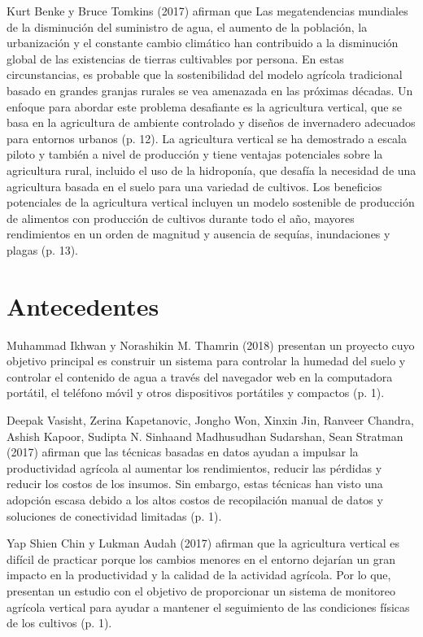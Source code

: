 \documentclass{report}
\begin{document}
  Kurt Benke y Bruce Tomkins (2017) afirman que Las megatendencias mundiales de
  la disminución del suministro de agua, el aumento de la población, la
  urbanización y el constante cambio climático han contribuido a la disminución
  global de las existencias de tierras cultivables por persona. En estas
  circunstancias, es probable que la sostenibilidad del modelo agrícola
  tradicional basado en grandes granjas rurales se vea amenazada en las próximas
  décadas. Un enfoque para abordar este problema desafiante es la agricultura
  vertical, que se basa en la agricultura de ambiente controlado y diseños de
  invernadero adecuados para entornos urbanos (p. 12). La agricultura vertical
  se ha demostrado a escala piloto y también a nivel de producción y tiene
  ventajas potenciales sobre la agricultura rural, incluido el uso de la
  hidroponía, que desafía la necesidad de una agricultura basada en el suelo
  para una variedad de cultivos. Los beneficios potenciales de la agricultura
  vertical incluyen un modelo sostenible de producción de alimentos con
  producción de cultivos durante todo el año, mayores rendimientos en un orden
  de magnitud y ausencia de sequías, inundaciones y plagas (p. 13).
\section{Antecedentes}
Muhammad Ikhwan y Norashikin M. Thamrin (2018) presentan un proyecto cuyo
objetivo principal es construir un sistema para controlar la humedad del suelo y
controlar el contenido de agua a través del navegador web en la computadora
portátil, el teléfono móvil y otros dispositivos portátiles y compactos (p. 1).

Deepak Vasisht, Zerina Kapetanovic, Jongho Won, Xinxin Jin, Ranveer Chandra,
Ashish Kapoor, Sudipta N. Sinhaand Madhusudhan Sudarshan, Sean Stratman (2017)
afirman que las técnicas basadas en datos ayudan a impulsar la productividad
agrícola al aumentar los rendimientos, reducir las pérdidas y reducir los costos
de los insumos. Sin embargo, estas técnicas han visto una adopción escasa debido
a los altos costos de recopilación manual de datos y soluciones de conectividad
limitadas (p. 1).

Yap Shien Chin y Lukman Audah (2017) afirman que la agricultura vertical es
difícil de practicar porque los cambios menores en el entorno dejarían un gran
impacto en la productividad y la calidad de la actividad agrícola. Por lo que,
presentan un estudio con el objetivo de proporcionar un sistema de monitoreo
agrícola vertical para ayudar a mantener el seguimiento de las condiciones
físicas de los cultivos (p. 1).
\end{document}
